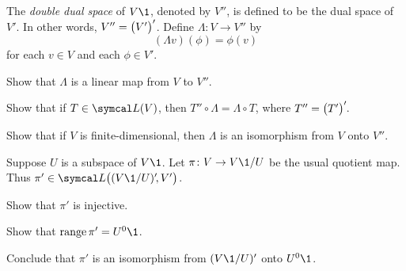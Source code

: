 \begin{exercises}
\pagebreak[3]

\exercise
The \emph{double dual space} of $V\1$, denoted by $V''\!$, is defined to be the dual space of~$V'\!$. In other words,
$V'' = {\paren[\big]{V'}}'$\!. Define $\Lambda \colon V \to V''$ by
\[
(\Lambda v)(\phi) = \phi(v)
\]
for each $v \in V$ and each $\phi \in V'\!$.
\begin{subtheorem}
\item
Show that $\Lambda$ is a linear map from $V$ to $V''\!$.
\item
Show that if $T \in \L(V)$, then $T'' \circ \Lambda = \Lambda \circ T$, where $T'' = {\paren[\big]{T'}}'\!$.
\item
Show that if $V$ is finite-dimensional, then $\Lambda$ is an isomorphism from $V$ onto $V''\!$.
\end{subtheorem}

\exercise
Suppose $U$ is a subspace of $V\1$. Let $\pi \colon V \to V\1/U$ be the usual quotient map. Thus $\pi' \in \L\bigl((V\1/U)'\!, V'\bigr)$.
\begin{subtheorem}
\item
Show that $\pi'$ is injective.
\item
Show that $\ran \pi' = U^0\1$.
\item
Conclude that $\pi'$ is an isomorphism from $(V\1/U)'$ onto $U^0\1$.
\end{subtheorem}


\end{exercises}

\endinput 
